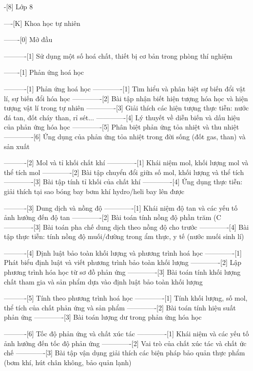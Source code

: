 -[8] Lớp 8

----[K] Khoa học tự nhiên

-------[0] Mở đầu

----------[1] Sử dụng một số hoá chất, thiết bị cơ bản trong phòng thí nghiệm

-------[1] Phản ứng hoá học

----------[1] Phản ứng hoá học
-------------[1] Tìm hiểu và phân biệt sự biến đổi vật lí, sự biến đổi hóa học
-------------[2] Bài tập nhận biết hiện tượng hóa học và hiện tượng vật lí trong tự nhiên
-------------[3] Giải thích các hiện tượng thực tiễn: nước đá tan, đốt cháy than, rỉ sét...
-------------[4] Lý thuyết về diễn biến và dấu hiệu của phản ứng hóa học
-------------[5] Phân biệt phản ứng tỏa nhiệt và thu nhiệt
-------------[6] Ứng dụng của phản ứng tỏa nhiệt trong đời sống (đốt gas, than) và sản xuất

----------[2] Mol và tỉ khối chất khí
-------------[1] Khái niệm mol, khối lượng mol và thể tích mol
-------------[2] Bài tập chuyển đổi giữa số mol, khối lượng và thể tích
-------------[3] Bài tập tính tỉ khối của chất khí
-------------[4] Ứng dụng thực tiễn: giải thích tại sao bóng bay bơm khí hydro/heli bay lên được

----------[3] Dung dịch và nồng độ
-------------[1] Khái niệm độ tan và các yếu tố ảnh hưởng đến độ tan
-------------[2] Bài toán tính nồng độ phần trăm (C%
-------------[3] Bài toán pha chế dung dịch theo nồng độ cho trước
-------------[4] Bài tập thực tiễn: tính nồng độ muối/đường trong ẩm thực, y tế (nước muối sinh lí)

----------[4] Định luật bảo toàn khối lượng và phương trình hoá học
-------------[1] Phát biểu định luật và viết phương trình bảo toàn khối lượng
-------------[2] Lập phương trình hóa học từ sơ đồ phản ứng
-------------[3] Bài toán tính khối lượng chất tham gia và sản phẩm dựa vào định luật bảo toàn khối lượng

----------[5] Tính theo phương trình hoá học
-------------[1] Tính khối lượng, số mol, thể tích của chất phản ứng và sản phẩm
-------------[2] Bài toán tính hiệu suất phản ứng
-------------[3] Bài toán lượng dư trong phản ứng hóa học

----------[6] Tốc độ phản ứng và chất xúc tác
-------------[1] Khái niệm và các yếu tố ảnh hưởng đến tốc độ phản ứng
-------------[2] Vai trò của chất xúc tác và chất ức chế
-------------[3] Bài tập vận dụng giải thích các biện pháp bảo quản thực phẩm (bơm khí, hút chân không, bảo quản lạnh)


